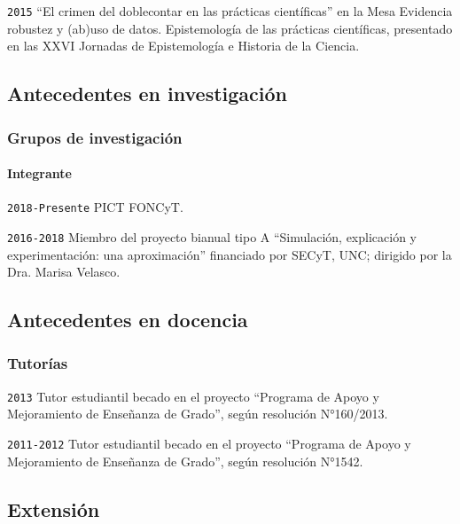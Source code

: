 \documentclass[]{article}
\let\oldparagraph\paragraph
\renewcommand{\paragraph}[1]{\oldparagraph{#1}\mbox{}}
\begin{document}
\texttt{2015} ``El crimen del doblecontar en las prácticas científicas''
en la Mesa Evidencia robustez y (ab)uso de datos. Epistemología de las
prácticas científicas, presentado en las XXVI Jornadas de Epistemología
e Historia de la Ciencia.

\hypertarget{antecedentes-en-investigaciuxf3n}{%
\subsection{Antecedentes en
investigación}\label{antecedentes-en-investigaciuxf3n}}

\hypertarget{grupos-de-investigaciuxf3n}{%
\subsubsection{Grupos de
investigación}\label{grupos-de-investigaciuxf3n}}

\hypertarget{integrante}{%
\paragraph{Integrante}\label{integrante}}

\texttt{2018-Presente} PICT FONCyT.

\texttt{2016-2018} Miembro del proyecto bianual tipo A ``Simulación,
explicación y experimentación: una aproximación'' financiado por SECyT,
UNC; dirigido por la Dra. Marisa Velasco.


\hypertarget{antecedentes-en-docencia}{%
\subsection{Antecedentes en
docencia}\label{antecedentes-en-docencia}}

\hypertarget{tutoruxedas}{%
\subsubsection{Tutorías}\label{tutoruxedas}}

\texttt{2013} Tutor estudiantil becado en el proyecto ``Programa de
Apoyo y Mejoramiento de Enseñanza de Grado'', según resolución
N°160/2013.

\texttt{2011-2012} Tutor estudiantil becado en el proyecto ``Programa de
Apoyo y Mejoramiento de Enseñanza de Grado'', según resolución N°1542.

\hypertarget{extensiuxf3n}{%
\subsection{Extensión}\label{extensiuxf3n}}
\end{document}
